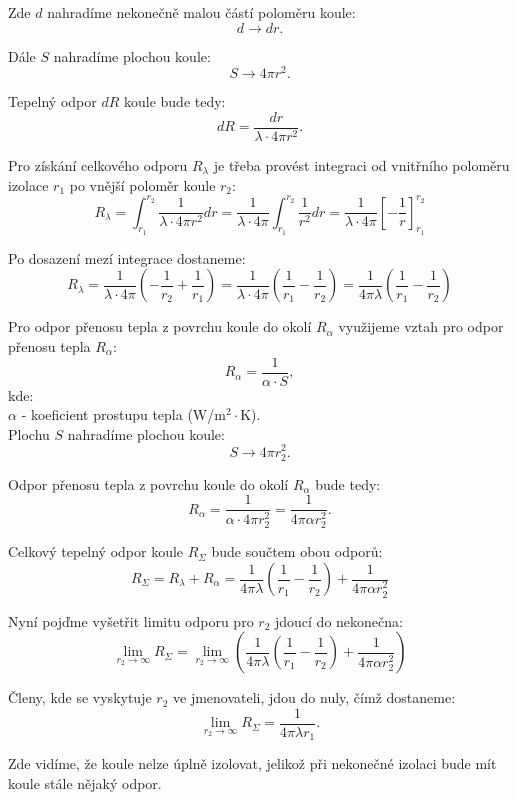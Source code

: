 \documentclass{article}
\begin{document}
Zde $d$ nahradíme nekonečně malou částí poloměru koule:
$$
    d \rightarrow dr.
$$

Dále $S$ nahradíme plochou koule:
$$
    S \rightarrow 4 \pi r^2.
$$

Tepelný odpor $dR$ koule bude tedy:
$$
    dR = \frac{dr}{\lambda \cdot 4 \pi r^2}.
$$

Pro získání celkového odporu $R_{\lambda}$ je třeba provést integraci od vnitřního poloměru izolace $r_1$ po vnější poloměr koule $r_2$:
$$
    R_{\lambda} = \int_{r_1}^{r_2} \frac{1}{\lambda \cdot 4 \pi r^2} dr = \frac{1}{\lambda \cdot 4 \pi} \int_{r_1}^{r_2} \frac{1}{r^2} dr = \frac{1}{\lambda \cdot 4 \pi} \left[ -\frac{1}{r} \right]_{r_1}^{r_2}
$$

Po dosazení mezí integrace dostaneme:
$$
    R_{\lambda} = \frac{1}{\lambda \cdot 4 \pi} \left( -\frac{1}{r_2} + \frac{1}{r_1} \right) = \frac{1}{\lambda \cdot 4 \pi} \left( \frac{1}{r_1} - \frac{1}{r_2} \right) = \frac{1}{4 \pi \lambda} \left( \frac{1}{r_1} - \frac{1}{r_2} \right)
$$

Pro odpor přenosu tepla z povrchu koule do okolí $R_{\alpha}$ využijeme vztah pro odpor přenosu tepla $R_{\alpha}$:
$$
    R_{\alpha} = \frac{1}{\alpha \cdot S},
$$
kde:\\
$\alpha$ - koeficient prostupu tepla (W/m$^2 \cdot$K).\\

Plochu $S$ nahradíme plochou koule:
$$
    S \rightarrow 4 \pi r_2^2.
$$

Odpor přenosu tepla z povrchu koule do okolí $R_{\alpha}$ bude tedy:
$$
    R_{\alpha} = \frac{1}{\alpha \cdot 4 \pi r_2^2} = \frac{1}{4 \pi \alpha r_2^2}.
$$

Celkový tepelný odpor koule $R_{\Sigma}$ bude součtem obou odporů:
$$
    R_{\Sigma} = R_{\lambda} + R_{\alpha} = \frac{1}{4 \pi \lambda} \left( \frac{1}{r_1} - \frac{1}{r_2} \right) + \frac{1}{4 \pi \alpha r_2^2}
$$

Nyní pojďme vyšetřit limitu odporu pro $r_2$ jdoucí do nekonečna:
$$
    \lim_{r_2 \to \infty} R_{\Sigma} = \lim_{r_2 \to \infty} \left( \frac{1}{4 \pi \lambda} \left( \frac{1}{r_1} - \frac{1}{r_2} \right) + \frac{1}{4 \pi \alpha r_2^2} \right)
$$

Členy, kde se vyskytuje $r_2$ ve jmenovateli, jdou do nuly, čímž dostaneme:
$$
    \lim_{r_2 \to \infty} R_{\Sigma} = \frac{1}{4 \pi \lambda r_1}.
$$

Zde vidíme, že koule nelze úplně izolovat, jelikož při nekonečné izolaci bude mít koule stále nějaký odpor.
\end{document}
